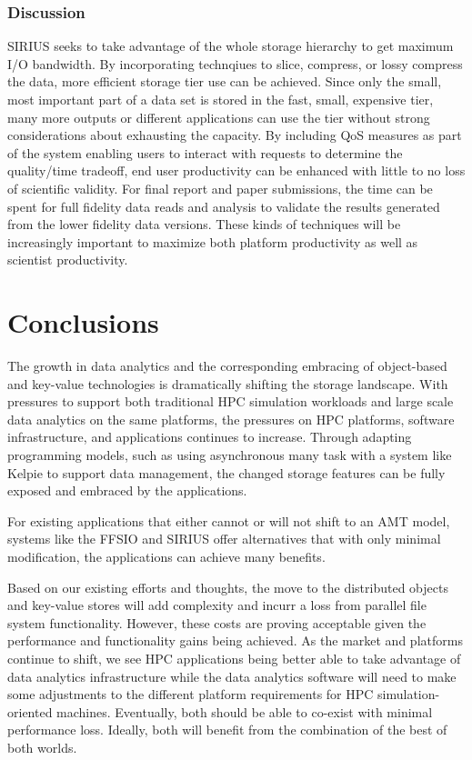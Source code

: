 \subsubsection{Discussion}
SIRIUS seeks to take advantage of the whole storage hierarchy to get maximum
I/O bandwidth. By incorporating technqiues to slice, compress, or lossy
compress the data, more efficient storage tier use can be achieved. Since only
the small, most important part of a data set is stored in the fast, small,
expensive tier, many more outputs or different applications can use the tier
without strong considerations about exhausting the capacity. By including QoS
measures as part of the system enabling users to interact with requests to
determine the quality/time tradeoff, end user productivity can be enhanced with
little to no loss of scientific validity. For final report and paper
submissions, the time can be spent for full fidelity data reads and analysis to
validate the results generated from the lower fidelity data versions. These
kinds of techniques will be increasingly important to maximize both platform
productivity as well as scientist productivity.

\section{Conclusions}\label{sec:conclusion}

The growth in data analytics and the corresponding embracing of object-based and key-value technologies is dramatically shifting the storage landscape. With pressures to support both traditional HPC simulation workloads and large scale data analytics on the same platforms, the pressures on HPC platforms, software infrastructure, and applications continues to increase. Through adapting programming models, such as using asynchronous many task with a system like Kelpie to support data management, the changed storage features can be fully exposed and embraced by the applications.

For existing applications that either cannot or will not shift to an AMT model, systems like the FFSIO and SIRIUS offer alternatives that with only minimal modification, the applications can achieve many benefits.

Based on our existing efforts and thoughts, the move to the distributed objects
and key-value stores will add complexity and incurr a loss from parallel file
system functionality. However, these costs are proving acceptable given the
performance and functionality gains being achieved. As the market and platforms
continue to shift, we see HPC applications being better able to take advantage
of data analytics infrastructure while the data analytics software will need to
make some adjustments to the different platform requirements for HPC
simulation-oriented machines. Eventually, both should be able to co-exist with
minimal performance loss. Ideally, both will benefit from the combination of
the best of both worlds.

